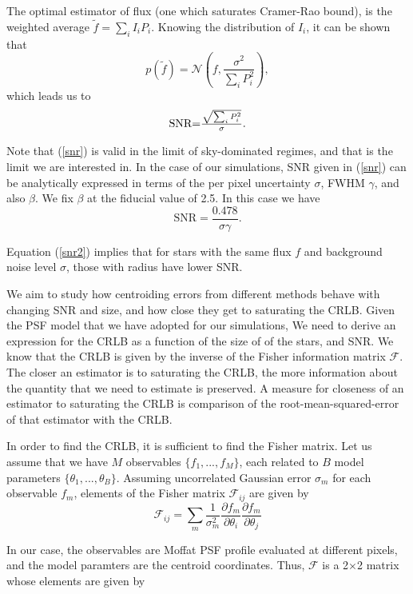 \documentclass[12pt, preprint]{aastex}
\newcommand{\beq}{\begin{equation}}
\newcommand{\eeq}{\end{equation}}
\begin{document}
The optimal estimator of flux (one which saturates Cramer-Rao bound),
is the weighted average $\tilde{f}=\sum_{i}I_{i}P_{i}$. Knowing the
distribution of $I_{i}$, it can be shown that 
\beq
p(\tilde{f}) = \mathcal{N}(f , \frac{\sigma^{2}}{\sum_{i}P_{i}^{2}}),
\eeq  
which leads us to
\beq
\begin{array}{l}
\text{SNR} $=$ \frac{\sqrt{\sum_{i} P_{i}^{2}}}{\sigma}.
\end{array}
\label{snr}
\eeq

Note that (\ref{snr}) is valid in the limit of sky-dominated regimes,
and that is the limit we are interested in. In the case of our simulations,
SNR given in (\ref{snr}) can be analytically expressed in terms of the per pixel uncertainty
$\sigma$, FWHM $\gamma$, and also $\beta$. We fix $\beta$ at the fiducial value of 2.5.
In this case we have
\beq
\text{SNR} = \frac{0.478}{\sigma \gamma}.
\label{snr2}
\eeq

Equation (\ref{snr2}) implies that for stars with the same flux $f$ and background
noise level $\sigma$, those with radius have lower SNR.

We aim to study how centroiding errors from different methods behave with
changing SNR and size, and how close they get to saturating the CRLB. 
Given the PSF model that we have adopted for our simulations, We need 
to derive an expression for the CRLB as a function of the size of of
the stars, and SNR. We know that the CRLB is given by the inverse of 
the Fisher information matrix $\mathcal{F}$. The closer an estimator is
to saturating the CRLB, the more information about the quantity that we 
need to estimate is preserved. A measure for closeness of an estimator to 
saturating the CRLB is comparison of the root-mean-squared-error of that estimator 
with the CRLB.

In order to find the CRLB, it is sufficient to find the Fisher matrix.
Let us assume that we have $M$ observables $\{f_{1}, ... , f_{M}\}$, each
related to $B$ model parameters $\{\theta_{1} , ... , \theta_{B}\}$. Assuming
uncorrelated Gaussian error $\sigma_{m}$ for each observable $f_{m}$, elements
of the Fisher matrix $\mathcal{F}_{ij}$ are given by
\beq
\mathcal{F}_{ij} = \sum_{m}\frac{1}{\sigma_{m}^{2}}\frac{\partial f_{m}}{\partial \theta_{i}}\frac{\partial f_{m}}{\partial \theta_{j}}
\label{fisher}
\eeq

In our case, the observables are Moffat PSF profile evaluated at different pixels, and  
the model paramters are the centroid coordinates. Thus, $\mathcal{F}$
is a 2$\times$2 matrix whose elements are given by
\end{document}
